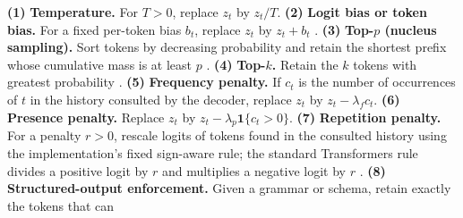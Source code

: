 \documentclass{article}
\begin{document}
%
%
%
%
%
\noindent \textbf{(1)} \textbf{Temperature.} For $T>0$, replace $z_t$ by $z_t/T$. \textbf{(2)}
\textbf{Logit bias or token bias.} For a fixed per-token bias $b_t$, replace
$z_t$ by $z_t+b_t$ \citep{openai_chat_sampling}. \textbf{(3)} \textbf{Top-$p$ (nucleus
sampling).} Sort tokens by decreasing probability and retain the shortest
prefix whose cumulative mass is at least $p$ \citep{holtzman2020nucleus}. \textbf{(4)}
\textbf{Top-$k$.} Retain the $k$ tokens with greatest probability
\citep{huggingface_generation}. \textbf{(5)} \textbf{Frequency penalty.} If $c_t$ is the
number of occurrences of $t$ in the history consulted by the decoder, replace
$z_t$ by $z_t-\lambda_f c_t$. \textbf{(6)} \textbf{Presence penalty.} Replace $z_t$ by
$z_t-\lambda_p\mathbf{1}\{c_t>0\}$. \textbf{(7)} \textbf{Repetition penalty.} For a
penalty $r>0$, rescale logits of tokens found in the consulted history using the
implementation's fixed sign-aware rule; the standard Transformers rule divides
a positive logit by $r$ and multiplies a negative logit by $r$
\citep{huggingface_repetition_penalty}. \textbf{(8)} \textbf{Structured-output
enforcement.} Given a grammar or schema, retain exactly the tokens that can
\end{document}
